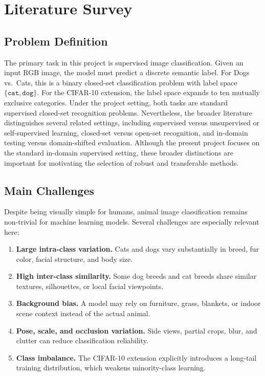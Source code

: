 \documentclass[11pt,a4paper]{article}
\begin{document}
\section{Literature Survey}

\subsection{Problem Definition}
The primary task in this project is supervised image classification. Given an input RGB image, the model must predict a discrete semantic label. For Dogs vs.\ Cats, this is a binary closed-set classification problem with label space $\{ \texttt{cat}, \texttt{dog} \}$. For the CIFAR-10 extension, the label space expands to ten mutually exclusive categories. Under the project setting, both tasks are standard supervised closed-set recognition problems. Nevertheless, the broader literature distinguishes several related settings, including supervised versus unsupervised or self-supervised learning, closed-set versus open-set recognition, and in-domain testing versus domain-shifted evaluation. Although the present project focuses on the standard in-domain supervised setting, these broader distinctions are important for motivating the selection of robust and transferable methods.

\subsection{Main Challenges}
Despite being visually simple for humans, animal image classification remains non-trivial for machine learning models. Several challenges are especially relevant here:
\begin{enumerate}
  \item \textbf{Large intra-class variation.} Cats and dogs vary substantially in breed, fur color, facial structure, and body size.
  \item \textbf{High inter-class similarity.} Some dog breeds and cat breeds share similar textures, silhouettes, or local facial viewpoints.
  \item \textbf{Background bias.} A model may rely on furniture, grass, blankets, or indoor scene context instead of the actual animal.
  \item \textbf{Pose, scale, and occlusion variation.} Side views, partial crops, blur, and clutter can reduce classification reliability.
  \item \textbf{Class imbalance.} The CIFAR-10 extension explicitly introduces a long-tail training distribution, which weakens minority-class learning.
\end{enumerate}
\end{document}
